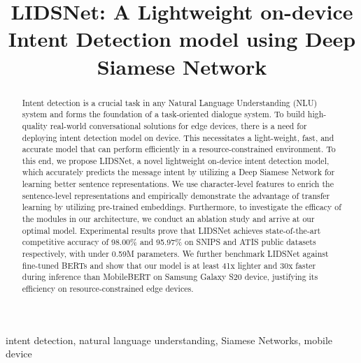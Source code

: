 \documentclass[conference]{IEEEtran}
\begin{document}
\title{
	LIDSNet: A Lightweight on-device Intent Detection model using Deep Siamese Network
}

\author{
}


\maketitle

\begin{abstract}

	Intent detection is a crucial task in any Natural Language Understanding (NLU) system and forms the foundation of a task-oriented dialogue system. To build high-quality real-world conversational solutions for edge devices, there is a need for deploying intent detection model on device. This necessitates a light-weight, fast, and accurate model that can perform efficiently in a resource-constrained environment. To this end, we propose LIDSNet, a novel lightweight on-device intent detection model, which accurately predicts the message intent by utilizing a Deep Siamese Network for learning better sentence representations. We use character-level features to enrich the sentence-level representations and empirically demonstrate the advantage of transfer learning by utilizing pre-trained embeddings. Furthermore, to investigate the efficacy of the modules in our architecture, we conduct an ablation study and arrive at our optimal model. Experimental results prove that LIDSNet achieves state-of-the-art competitive accuracy of 98.00\% and 95.97\% on SNIPS \cite{coucke2018snips} and ATIS \cite{price-1990-evaluation} public datasets respectively, with under 0.59M parameters. We further benchmark LIDSNet against fine-tuned BERTs and show that our model is at least 41x lighter and 30x faster during inference than MobileBERT \cite{sun-etal-2020-mobilebert} on Samsung Galaxy S20 device, justifying its efficiency on resource-constrained edge devices.

\end{abstract}

\begin{IEEEkeywords}
	intent detection, natural language understanding, Siamese Networks, mobile device
\end{IEEEkeywords}
\end{document}
